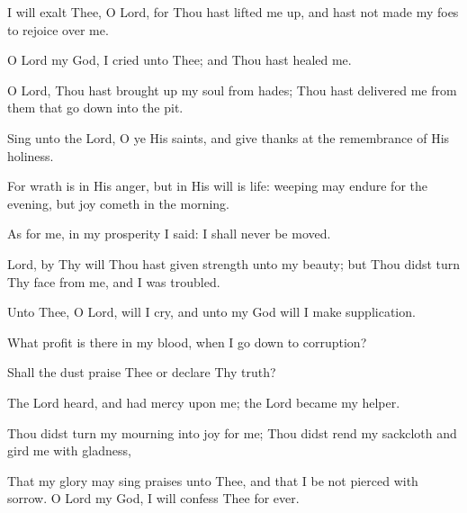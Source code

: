I will exalt Thee, O Lord, for Thou hast lifted me up, and hast not made my foes to rejoice over me.

O Lord my God, I cried unto Thee; and Thou hast healed me.

O Lord, Thou hast brought up my soul from hades; Thou hast delivered me from them that go down into the pit.

Sing unto the Lord, O ye His saints, and give thanks at the remembrance of His holiness.

For wrath is in His anger, but in His will is life: weeping may endure for the evening, but joy cometh in the morning.

As for me, in my prosperity I said: I shall never be moved.

Lord, by Thy will Thou hast given strength unto my beauty; but Thou didst turn Thy face from me, and I was troubled.

Unto Thee, O Lord, will I cry, and unto my God will I make supplication.

What profit is there in my blood, when I go down to corruption?

Shall the dust praise Thee or declare Thy truth?

The Lord heard, and had mercy upon me; the Lord became my helper.

Thou didst turn my mourning into joy for me; Thou didst rend my sackcloth and gird me with gladness,

That my glory may sing praises unto Thee, and that I be not pierced with sorrow. O Lord my God, I will confess Thee for ever.
